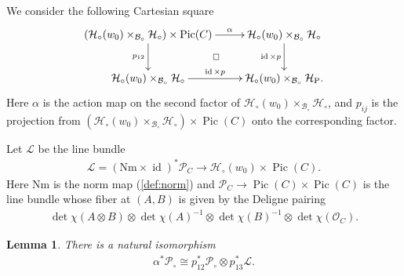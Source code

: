\documentclass[11pt,oneside,a4paper,mathscr]{amsart}
\makeatletter
\newtheorem{lemma}[thm]{Lemma}
\theoremstyle{definition}
\newcommand{\Pic}{\operatorname{Pic}}
\newcommand{\cH}{\mathcal{H}}
\newcommand{\cL}{\mathcal{L}}
\newcommand{\cB}{\mathcal{B}}
\newcommand{\cP}{\mathcal{P}}
\newcommand{\diasquare}{\ar@{}[rd]|\square}
\newcommand{\id}{\operatorname{id}}
\newcommand{\rP}{\mathrm{P}}
\makeatother
\begin{document}
We consider the following Cartesian square 
\begin{align}\label{dia:alpha}
    \xymatrix{(\cH_{\circ}(w_0)\times_{\cB_{\circ}}\cH_{\circ}) \times \Pic(C) \ar[r]^-{\alpha} \ar[d]_-{p_{12}} \diasquare 
    & \cH_{\circ}(w_0)\times_{\cB_{\circ}}\cH_{\circ} \ar[d]_-{\id\times p} \\
    \cH_{\circ}(w_0)\times_{\cB_{\circ}}\cH_{\circ} \ar[r]^-{\id \times p} & \cH_{\circ}(w_0)\times_{\cB_{\circ}}\cH_{\rP}.
    }
\end{align}
Here $\alpha$ is the action map on the second factor of $\cH_{\circ}(w_0)\times_{\cB_{\circ}}\cH_{\circ}$,  and $p_{ij}$ is the projection from $(\cH_{\circ}(w_0)\times_{\cB_{\circ}}\cH_{\circ}) \times \Pic(C)$
    onto the corresponding factor.
    
Let $\cL$ be the line bundle 
    \begin{align*}
        \cL=(\mathrm{Nm}\times\id)^* \cP_C \to \cH_{\circ}(w_0)\times \Pic(C).
    \end{align*}
    Here $\mathrm{Nm}$ is the norm map (\ref{def:norm}) and $\cP_C \to \Pic(C) \times \Pic(C)$ is the line bundle whose fiber 
    at $(A, B)$ is given by the Deligne pairing 
    \begin{align*}
        \det \chi(A\otimes B) \otimes \det \chi(A)^{-1}\otimes \det \chi(B)^{-1}\otimes \det \chi(\mathcal{O}_{C}).
    \end{align*}
\begin{lemma}\label{lbundle:pull}
    There is a natural isomorphism 
    \begin{align*}
        \alpha^* \cP_{\circ} \cong p_{12}^* \cP_{\circ} \otimes p_{13}^* \cL.
    \end{align*}
\end{lemma}
\end{document}
